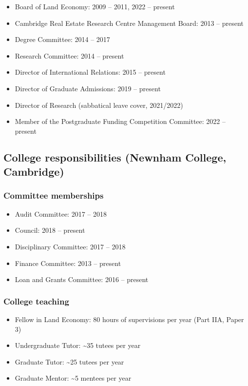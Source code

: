 \documentclass[11pt,a4paper]{article}
\providecommand{\tightlist}{%
  \setlength{\itemsep}{1pt}\setlength{\parskip}{0pt}}
\begin{document}
\begin{itemize}
\tightlist
\item
  Board of Land Economy: 2009 -- 2011, 2022 -- present
\item
  Cambridge Real Estate Research Centre Management Board: 2013 --
  present
\item
  Degree Committee: 2014 -- 2017
\item
  Research Committee: 2014 -- present
\item
  Director of International Relations: 2015 -- present
\item
  Director of Graduate Admissions: 2019 -- present
\item
  Director of Research (sabbatical leave cover, 2021/2022)
\item
  Member of the Postgraduate Funding Competition Committee: 2022 --
  present
\end{itemize}

\subsection{College responsibilities (Newnham College,
Cambridge)}\label{college-responsibilities-newnham-college-cambridge}

\subsubsection{Committee memberships}\label{committee-memberships}

\begin{itemize}
\tightlist
\item
  Audit Committee: 2017 -- 2018
\item
  Council: 2018 -- present
\item
  Disciplinary Committee: 2017 -- 2018
\item
  Finance Committee: 2013 -- present
\item
  Loan and Grants Committee: 2016 -- present
\end{itemize}

\subsubsection{College teaching}\label{college-teaching}

\begin{itemize}
\tightlist
\item
  Fellow in Land Economy: 80 hours of supervisions per year (Part IIA,
  Paper 3)
\item
  Undergraduate Tutor: \textasciitilde35 tutees per year
\item
  Graduate Tutor: \textasciitilde25 tutees per year
\item
  Graduate Mentor: \textasciitilde5 mentees per year
\end{itemize}
\end{document}
